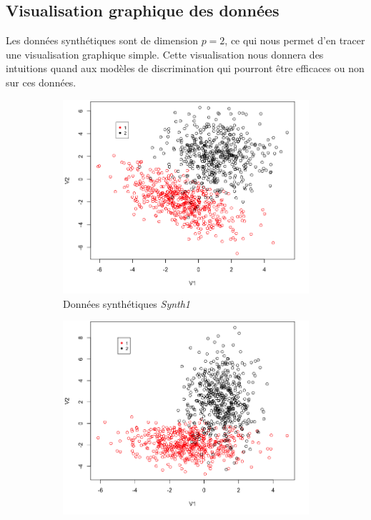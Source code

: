 \documentclass[a4paper,10pt]{report}
\begin{document}
\subsection{Visualisation graphique des données}

Les données synthétiques sont de dimension $p = 2$, ce qui nous permet d'en tracer une visualisation graphique simple. Cette visualisation nous donnera des intuitions quand aux modèles de discrimination qui pourront être efficaces ou non sur ces données.


\begin{figure}[H]
	\centering
	\captionsetup{justification=centering, margin=2cm}
	\begin{subfigure}[b]{0.5\linewidth}
		\centering
		\captionsetup{justification=centering, margin=1cm}
		\includegraphics[width=1\linewidth]{img/2-1-1-synth1-visualisation}
		\caption{\small Données synthétiques \textit{Synth1}}
	\end{subfigure}%
	\begin{subfigure}[b]{0.5\linewidth}
		\centering
		\captionsetup{justification=centering, margin=1cm}
		\includegraphics[width=1\linewidth]{img/2-1-1-synth2-visualisation}

\end{subfigure}
\end{figure}
\end{document}
